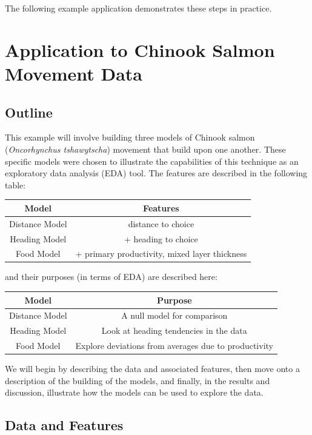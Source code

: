 \documentclass[11pt]{article}
\begin{document}
The following example application demonstrates these steps in practice. 

\section*{Application to Chinook Salmon Movement Data}

\subsection*{Outline}

This example will involve building three models of Chinook salmon (\textit{Oncorhynchus tshawytscha}) movement that build upon one another. These specific models were chosen to illustrate the capabilities of this technique as an exploratory data analysis (EDA) tool. The features are described in the following table: 

\begin{center}
\begin{tabular}{| c | c  | } 
\hline 
Model & Features \\
\hline
Distance Model & distance to choice \\
Heading Model & + heading to choice \\
Food Model & + primary productivity, mixed layer thickness \\
\hline
\end{tabular}
\end{center}

and their purposes (in terms of EDA) are described here:

\begin{center}
\begin{tabular}{| c | c  | } 
\hline 
Model & Purpose \\
\hline
Distance Model & A null model for comparison \\
Heading Model & Look at heading tendencies in the data \\
Food Model & Explore deviations from averages due to productivity \\
\hline
\end{tabular}
\end{center} 

We will begin by describing the data and associated features, then move onto a description of the building of the models, and finally, in the results and discussion, illustrate how the models can be used to explore the data. 

\subsection*{Data and Features}
\end{document}
